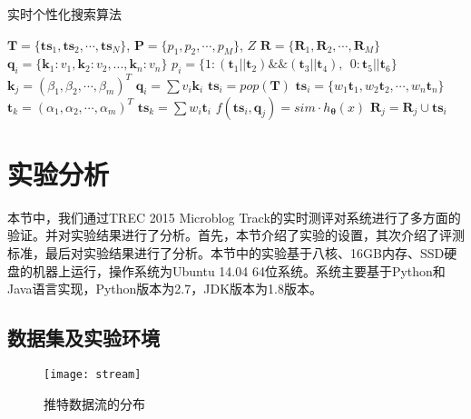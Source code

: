 \begin{algorithm}[!ht]
\caption{实时个性化搜索算法}
\label{alg:livePush}
\begin{algorithmic}[1]
  \REQUIRE $\mathbf{T} = \{ \mathbf{ts}_1, \mathbf{ts}_2, \cdots, \mathbf{ts}_N \}$, $\mathbf{P} = \{ p_1, p_2, \cdots, p_M \}$, $Z$
  \ENSURE $\mathbf{R} = \{ \mathbf{R}_1, \mathbf{R}_2, \cdots, \mathbf{R}_M \}$
    \STATE $\mathbf{q}_i = \{ {\mathbf{k}_1}:{v_1},{\mathbf{k}_2}:{v_2},...,{\mathbf{k}_n}:{v_n}\}$
    \STATE $p_i = \{1:\left(\mathbf{t}_1 || \mathbf{t}_2\right) \& \& \left(\mathbf{t}_3 || \mathbf{t}_4\right),~~0:\mathbf{t}_5 || \mathbf{t}_6\}$
  \ENDFOR
    \STATE $\mathbf{k}_j = \left(\beta_1,\beta_2,\cdots,\beta_m\right)^T$
    \STATE $\mathbf{q}_i = \sum v_i \mathbf{k}_i$
  \ENDFOR
    \STATE $\mathbf{ts}_i = pop\left(\mathbf{T}\right)$
    \STATE $\mathbf{ts}_i = \{ {w_1}{\mathbf{t}_1},{w_2}{\mathbf{t}_2},\cdots,{w_n}{\mathbf{t}_n}\}$
       \STATE $\mathbf{t}_k=\left(\alpha_1,\alpha_2,\cdots,\alpha_m\right)^T$
     \ENDFOR
     \STATE $\mathbf{ts}_k = \sum w_i \mathbf{t}_i$
     \STATE $f\left( \mathbf{ts}_i, \mathbf{q}_j \right) = sim \cdot {h_ {\bm{\theta}}}\left(x\right)$
    \ENDIF
      \STATE $\mathbf{R}_j = \mathbf{R}_j \cup \mathbf{ts}_i$
    \ENDIF
  \ENDWHILE
\end{algorithmic}
\end{algorithm}

\section{实验分析}
\label{sec2:experiment}
本节中，我们通过TREC 2015 Microblog Track的实时测评对系统进行了多方面的验证。并对实验结果进行了分析。首先，本节介绍了实验的设置，其次介绍了评测标准，最后对实验结果进行了分析。本节中的实验基于八核、16GB内存、SSD硬盘的机器上运行，操作系统为Ubuntu 14.04 64位系统。系统主要基于Python和Java语言实现，Python版本为2.7，JDK版本为1.8版本。

\subsection{数据集及实验环境}
\label{subsec2:dataset}
\begin{figure}[!htbp]
  \centering
  \texttt{[image: stream]}
  \caption{推特数据流的分布}
  \label{fig:twitterDis}
\end{figure}

